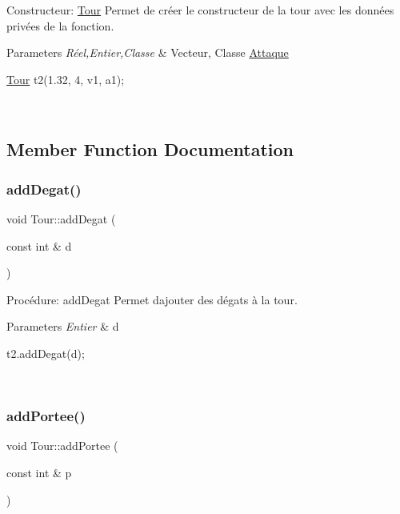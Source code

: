 Constructeur\+: \hyperlink{classTour}{Tour} Permet de créer le constructeur de la tour avec les données privées de la fonction. 


\begin{DoxyParams}{Parameters}
{\em Réel,Entier,Classe} & Vecteur, Classe \hyperlink{classAttaque}{Attaque} 
\begin{DoxyCode}
\hyperlink{classTour}{Tour} t2(1.32, 4, v1, a1);
\end{DoxyCode}
 \\
\hline
\end{DoxyParams}


\subsection{Member Function Documentation}
\mbox{\label{classTour_a928b2a239f9c5addd9e2a1f692a10ebb}} 
\subsubsection{\texorpdfstring{add\+Degat()}{addDegat()}}
{\footnotesize\ttfamily void Tour\+::add\+Degat (\begin{DoxyParamCaption}\item[{const int \&}]{d }\end{DoxyParamCaption})}



Procédure\+: add\+Degat Permet d\textquotesingle{}ajouter des dégats à la tour. 


\begin{DoxyParams}{Parameters}
{\em Entier} & d 
\begin{DoxyCode}
t2.addDegat(d);
\end{DoxyCode}
 \\
\hline
\end{DoxyParams}
\mbox{\label{classTour_a948e22c8003e63cc9a705787a421262d}} 
\subsubsection{\texorpdfstring{add\+Portee()}{addPortee()}}
{\footnotesize\ttfamily void Tour\+::add\+Portee (\begin{DoxyParamCaption}\item[{const int \&}]{p }\end{DoxyParamCaption})}



